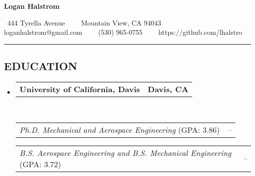 \documentclass[10pt,letterpaper,MMMyyyy,nonstop]{simpleresumecv}
\makeatletter
\newcommand{\CVAuthor}{Logan Halstrom}
\newcommand{\CVWebpage}{https://github.com/lhalstro}
\newcommand{\CVEmail}{loganhalstrom@gmail.com}
\newcommand{\CVPhone}{(530) 965-0755}
\newcommand{\CVAddressStreet}{444 Tyrella Avenue}
\newcommand{\CVAddressCity}{Mountain View, CA 94043}
\newcommand{\headerrow}[2]
{\begin{tabular*}{\linewidth}{l@{\extracolsep{\fill}}r}
    #1 &
    #2 \\
\end{tabular*}}
\makeatother
\begin{document}

\begin{center}
    {\huge \textbf{\CVAuthor}}

    \ \CVAddressStreet\ \ \textbullet
    \ \ \CVAddressCity
    \\
    \hspace{1.7em} \CVEmail\ \ \textbullet
               \ \ \CVPhone\ \ \textbullet
               \ \ \CVWebpage
\end{center}



\hrule
\vspace{-0.4em}
\subsection*{EDUCATION}

\begin{itemize}
    \parskip=0.1em

    \item
          \headerrow
          {\textbf{University of California, Davis}}
          {\textbf{Davis, CA}}
          \\
          \headerrow
          {\emph{Ph.D. Mechanical and Aerospace Engineering} (GPA: 3.86)}
          {\emph{\DatestampYMD{2013}{09}{15} -- \DatestampYMD{2020}{09}{15}} }

          \headerrow
          {\emph{B.S. Aerospace Engineering and B.S. Mechanical Engineering} (GPA: 3.72)}
          {\emph{\DatestampYMD{2008}{09}{15} -- \DatestampYMD{2013}{06}{15}} }

\end{itemize}
\end{document}
